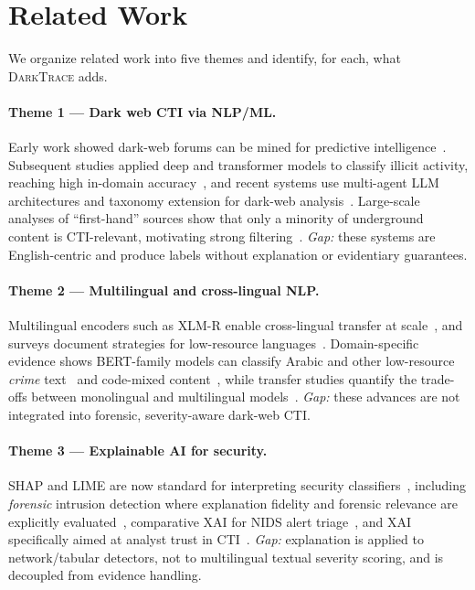 \documentclass[11pt,a4paper]{article}
\newcommand{\framework}{\textsc{DarkTrace}}
\begin{document}
\section{Related Work}\label{sec:related}

We organize related work into five themes and identify, for each, what \framework{}
adds.

\paragraph{Theme 1 --- Dark web CTI via NLP/ML.}
Early work showed dark-web forums can be mined for predictive
intelligence~\cite{kadoguchi2019exploring}. Subsequent studies applied deep and
transformer models to classify illicit activity, reaching high in-domain
accuracy~\cite{sangher2023towards,sangher2024lstm}, and recent systems use multi-agent
LLM architectures and taxonomy extension for dark-web
analysis~\cite{shah2025madcti,demarcos2026llm,pasupuleti2025threat}. Large-scale
analyses of ``first-hand'' sources show that only a minority of underground content is
CTI-relevant, motivating strong filtering~\cite{schroer2025darkside}. \emph{Gap:} these
systems are English-centric and produce labels without explanation or evidentiary
guarantees.

\paragraph{Theme 2 --- Multilingual and cross-lingual NLP.}
Multilingual encoders such as XLM-R enable cross-lingual transfer at
scale~\cite{conneau2020xlmr}, and surveys document strategies for low-resource
languages~\cite{pakray2025nlp}. Domain-specific evidence shows BERT-family models can
classify Arabic and other low-resource \emph{crime} text~\cite{alharbi2025bert} and
code-mixed content~\cite{nazir2025multilingual}, while transfer studies quantify the
trade-offs between monolingual and multilingual
models~\cite{thangaraj2024crosslingual}. \emph{Gap:} these advances are not integrated
into forensic, severity-aware dark-web CTI.

\paragraph{Theme 3 --- Explainable AI for security.}
SHAP and LIME are now standard for interpreting security
classifiers~\cite{salih2023perspective,gaspar2024xai}, including \emph{forensic}
intrusion detection where explanation fidelity and forensic relevance are explicitly
evaluated~\cite{hermosilla2025xai}, comparative XAI for NIDS alert
triage~\cite{kalakoti2025evaluating}, and XAI specifically aimed at analyst trust in
CTI~\cite{sunkara2025xai}. \emph{Gap:} explanation is applied to network/tabular
detectors, not to multilingual textual severity scoring, and is decoupled from
evidence handling.
\end{document}
